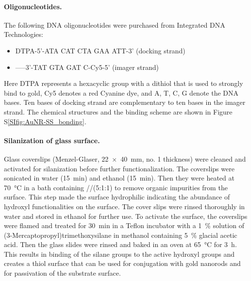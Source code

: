 \paragraph*{Oligonucleotides.} The following DNA oligonucleotides were purchased from Integrated DNA Technologies:
\begin{itemize}
	\item DTPA-5'-ATA CAT CTA GAA ATT-3' (docking strand)
	\item -----3'-TAT GTA GAT C-Cy5-5' (imager strand)
\end{itemize}
Here DTPA represents a hexacyclic group with a dithiol that is used to strongly bind to gold, Cy5 denotes a red Cyanine dye, and A, T, C, G denote the DNA bases. Ten bases of docking strand are complementary to ten bases in the imager strand. The chemical structures and the binding scheme are shown in Figure S\ref{SIfig:AuNR-SS_bonding}.


\paragraph*{Silanization of glass surface.} Glass coverslips (Menzel-Glaser, \SI[product-units=repeat]{22x40}{\mm}, no. 1 thickness) were cleaned and activated for silanization before further functionalization.
The coverslips were sonicated in water (\SI{15}{\minute}) and ethanol (\SI{15}{\minute}). 
Then they were heated  at \SI{70}{\celsius} in a bath containing //(5:1:1) to remove organic impurities from the surface.
This step made the surface hydrophilic indicating the abundance of hydroxyl functionalities on the surface.
The cover slips were rinsed thoroughly in water and stored in ethanol for further use.
To activate the surface, the coverslips were flamed and treated for 30~min in a Teflon incubator with a \SI{1}{\percent} solution of (3-Mercaptopropyl)trimethoxysilane in methanol containing \SI{5}{\percent} glacial acetic acid.
Then the glass slides were rinsed and baked in an oven at \SI{65}{\celsius} for \SI{3}{\hour}.
This results in binding of the silane groups to the active hydroxyl groups and creates a thiol surface that can be used for conjugation with gold nanorods and for passivation of the substrate surface.


